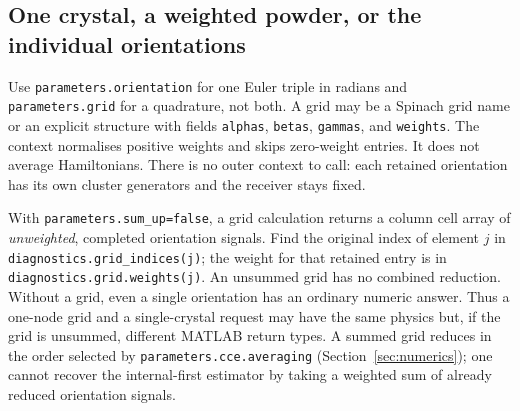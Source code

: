 \documentclass[11pt,a4paper]{article}
\begin{document}
\subsection{One crystal, a weighted powder, or the individual orientations}
Use \lstinline|parameters.orientation| for one Euler triple in radians and \lstinline|parameters.grid| for a quadrature, not both. A grid may be a Spinach grid name or an explicit structure with fields \lstinline|alphas|, \lstinline|betas|, \lstinline|gammas|, and \lstinline|weights|. The context normalises positive weights and skips zero-weight entries. It does not average Hamiltonians. There is no outer context to call: each retained orientation has its own cluster generators and the receiver stays fixed.

With \lstinline|parameters.sum_up=false|, a grid calculation returns a column cell array of \emph{unweighted}, completed orientation signals. Find the original index of element $j$ in \lstinline|diagnostics.grid_indices(j)|; the weight for that retained entry is in \lstinline|diagnostics.grid.weights(j)|. An unsummed grid has no combined reduction. Without a grid, even a single orientation has an ordinary numeric answer. Thus a one-node grid and a single-crystal request may have the same physics but, if the grid is unsummed, different MATLAB return types. A summed grid reduces in the order selected by \lstinline|parameters.cce.averaging| (Section~\ref{sec:numerics}); one cannot recover the internal-first estimator by taking a weighted sum of already reduced orientation signals.
\end{document}
